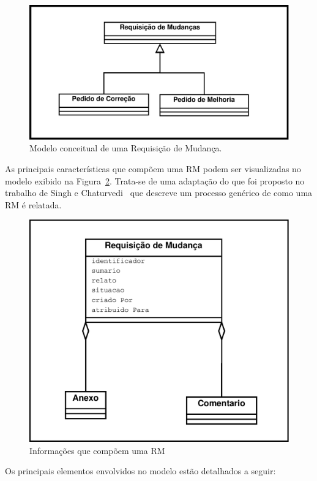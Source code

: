 \begin{figure}[htpb]
	\centering
	\includegraphics[width=0.5\linewidth]{./chapter-manutencao-software-visao-geral/img/diagrama-classe-conceitual-requisicao-mudancas.pdf}
	\caption{Modelo conceitual de uma Requisição de Mudança.}\label{fig:diagrama-classe-requisicao-mudancas}
\end{figure}

As principais características que compõem uma RM podem ser visualizadas no
modelo exibido na
Figura~\ref{fig:diagrama-classe-atributos-requisicao-mudancas}. Trata-se de uma
adaptação do que foi proposto no trabalho de Singh e
Chaturvedi~\cite{singh2011bug} que descreve um processo genérico de como uma RM
é relatada.

\begin{figure}[htpb]
	\centering
	\includegraphics[width=0.5\linewidth]{./chapter-manutencao-software-visao-geral/img/diagrama-classe-atributos-requisicao-mudancas.pdf}
	\caption{Informações que compõem uma RM}\label{fig:diagrama-classe-atributos-requisicao-mudancas}
\end{figure}

Os principais elementos envolvidos no modelo estão detalhados a seguir:

